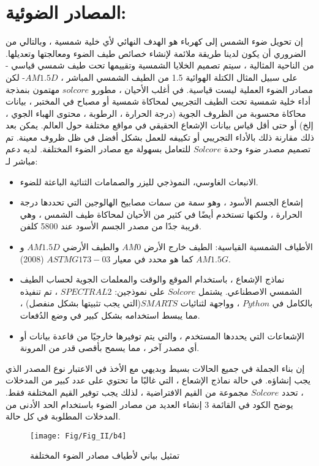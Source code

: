 \section{المصادر الضوئية:}
إن تحويل ضوء الشمس إلى كهرباء هو الهدف النهائي لأي خلية شمسية ، وبالتالي من الضروري أن يكون لدينا طريقة ملائمة لإنشاء خصائص طيف الضوء ومعالجتها وتعديلها. من الناحية المثالية ، سيتم تصميم الخلايا الشمسية وتقييمها تحت طيف شمسي قياسي - على سبيل المثال الكتلة الهوائية 1.5 من الطيف الشمسي المباشر ، $ AM1.5D  $- لكن مصادر الضوء العملية ليست قياسية. في أغلب الأحيان ، مطورو $ solcore $ مهتمون بنمذجة أداء خلية شمسية تحت الطيف التجريبي لمحاكاة شمسية أو مصباح في المختبر ، بيانات محاكاة محسوبة من الظروف الجوية (درجة الحرارة ، الرطوبة ، محتوى الهباء الجوي ، إلخ) أو حتى أقل قياس بيانات الإشعاع الحقيقي في مواقع مختلفة حول العالم. يمكن بعد ذلك مقارنة ذلك بالأداء التجريبي أو تكييفه للعمل بشكل أفضل في ظل ظروف معينة.
تم تصميم مصدر ضوء وحدة $ Solcore $ للتعامل بسهولة مع مصادر الضوء المختلفة. لديه دعم مباشر لـ:
\begin{itemize}
	\item 
	
الانبعاث الغاوسي، النموذجي لليزر والصمامات الثنائية الباعثة للضوء.
	\item 
إشعاع الجسم الأسود ، وهو سمة من سمات مصابيح الهالوجين التي تحددها درجة الحرارة ، ولكنها تستخدم أيضًا في كثير من الأحيان لمحاكاة طيف الشمس ، وهي قريبة جدًا من مصدر الجسم الأسود عند 5800 كلفن.
	\item 
الأطياف الشمسية القياسية: الطيف خارج الأرض $ AM0 $ والطيف الأرضي $ AM1.5D $ و $ AM1.5G $ كما هو محدد في معيار $ ASTM G173-03 $ (2008).
	\item 
نماذج الإشعاع ، باستخدام الموقع والوقت والمعلمات الجوية لحساب الطيف الشمسي الاصطناعي. يشتمل $ Solcore $ على نموذجين:
	$ SPECTRAL2 $ ، تم تنفيذه بالكامل في $ Python $ ،
وواجهة لثنائيات $ SMARTS  $(التي يجب تثبيتها بشكل منفصل) ، مما يبسط استخدامه بشكل كبير في وضع الدُفعات.
	\item 
الإشعاعات التي يحددها المستخدم ، والتي يتم توفيرها خارجيًا من قاعدة بيانات أو أي مصدر آخر ، مما يسمح بأقصى قدر من المرونة.
\end{itemize}
إن بناء الجملة في جميع الحالات بسيط وبديهي مع الأخذ في الاعتبار نوع المصدر الذي يجب إنشاؤه. في حالة نماذج الإشعاع ، التي غالبًا ما تحتوي على عدد كبير من المدخلات ، تحدد $ Solcore $ مجموعة من القيم الافتراضية ، لذلك يجب توفير القيم المختلفة فقط. يوضح الكود في القائمة 3 إنشاء العديد من مصادر الضوء باستخدام الحد الأدنى من المدخلات المطلوبة في كل حالة.

\begin{figure}[h!]
	\centering
	\texttt{[image: Fig/Fig\_II/b4]}
	\caption{تمثيل بياني لأطياف مصادر الضوء المختلفة}
	\label{fig:b4}
\end{figure}
\FloatBarrier

